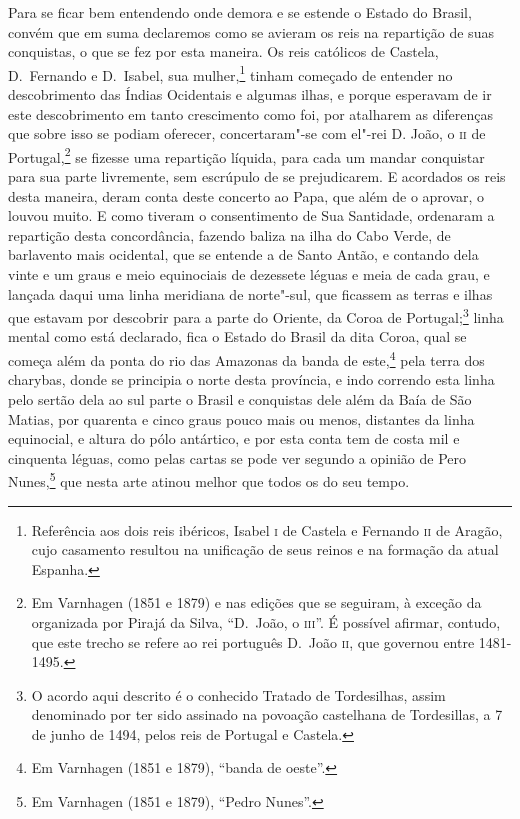 Para se ficar bem entendendo onde demora e se estende o Estado do Brasil, convém que em
suma declaremos como se avieram os reis na repartição de suas conquistas, o que se fez por
esta maneira. Os reis católicos de Castela, D.~Fernando e D.~Isabel, sua mulher,\footnote{
Referência aos dois reis ibéricos, Isabel \textsc{i} de Castela e Fernando \textsc{ii} de
Aragão, cujo casamento resultou na unificação de seus reinos e na formação da atual
Espanha.} tinham começado de entender no descobrimento das Índias Ocidentais e algumas
ilhas, e porque esperavam de ir este descobrimento em tanto crescimento como foi, por
atalharem as diferenças que sobre isso se podiam oferecer, concertaram"-se com el"-rei D.
João, o \textsc{ii} de Portugal,\footnote{ Em Varnhagen (1851 e 1879) e nas edições que se
seguiram, à exceção da organizada por Pirajá da Silva, ``D.~João, o \textsc{iii}''. É
possível afirmar, contudo, que este trecho se refere ao rei português D.~João \textsc{ii},
que governou entre 1481-1495.} se fizesse uma repartição líquida, para cada um mandar
conquistar para sua parte livremente, sem escrúpulo de se prejudicarem. E acordados os
reis desta maneira, deram conta deste concerto ao Papa, que além de o aprovar, o louvou
muito. E como tiveram o consentimento de Sua Santidade, ordenaram a repartição desta
concordância, fazendo baliza na ilha do Cabo Verde, de barlavento mais ocidental, que se
entende a de Santo Antão, e contando dela vinte e um graus e meio equinociais de dezessete
léguas e meia de cada grau, e lançada daqui uma linha meridiana de norte"-sul, que ficassem
as terras e ilhas que estavam por descobrir para a parte do Oriente, da Coroa de
Portugal;\footnote{ O acordo aqui descrito é o conhecido Tratado de Tordesilhas, assim
denominado por ter sido assinado na povoação castelhana de Tordesillas, a 7 de junho de
1494, pelos reis de Portugal e Castela.} linha mental como está declarado, fica o Estado
do Brasil da dita Coroa, qual se começa além da ponta do rio das Amazonas da banda de
este,\footnote{ Em Varnhagen (1851 e 1879), ``banda de oeste''.} pela terra dos charybas, donde se principia o norte desta província, e indo
correndo esta linha pelo sertão dela ao sul parte o Brasil e conquistas dele além da Baía
de São Matias, por quarenta e cinco graus pouco mais ou menos, distantes da linha
equinocial, e altura do pólo antártico, e por esta conta tem de costa mil e cinquenta
léguas, como pelas cartas se pode ver segundo a opinião de Pero Nunes,\footnote{ Em
Varnhagen (1851 e 1879), ``Pedro Nunes''.} que nesta arte atinou melhor que todos os do
seu tempo.

